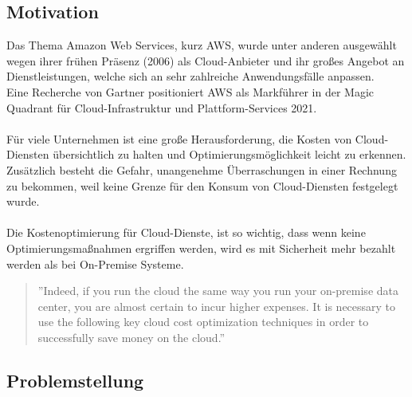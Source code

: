 \subsection{Motivation}
Das Thema Amazon Web Services, kurz AWS, wurde unter anderen ausgewählt wegen ihrer frühen Präsenz (2006) als Cloud-Anbieter und ihr großes Angebot an Dienstleistungen, welche sich an sehr zahlreiche Anwendungsfälle anpassen.
\\
Eine Recherche von Gartner positioniert AWS als Markführer in der Magic Quadrant für Cloud-Infrastruktur und Plattform-Services 2021.
{\cite{G01}}
\\\\
Für viele Unternehmen ist eine große Herausforderung, die Kosten von Cloud-Diensten übersichtlich zu halten und Optimierungsmöglichkeit leicht zu erkennen. Zusätzlich besteht die Gefahr, unangenehme Überraschungen in einer Rechnung zu bekommen, weil keine Grenze für den Konsum von Cloud-Diensten festgelegt wurde. 
\\\\
Die Kostenoptimierung für Cloud-Dienste, ist so wichtig, dass wenn keine Optimierungsmaßnahmen ergriffen werden, wird es mit Sicherheit mehr bezahlt werden als bei On-Premise Systeme.
\\
\begin{quote}
    ”Indeed, if you run the cloud the same way you run your on-premise data center, you are almost certain to incur higher expenses. It is necessary to use the following key cloud cost optimization techniques in order to successfully save money on the cloud.”
{\cite{CCB}}
\end{quote}

\subsection{Problemstellung}


